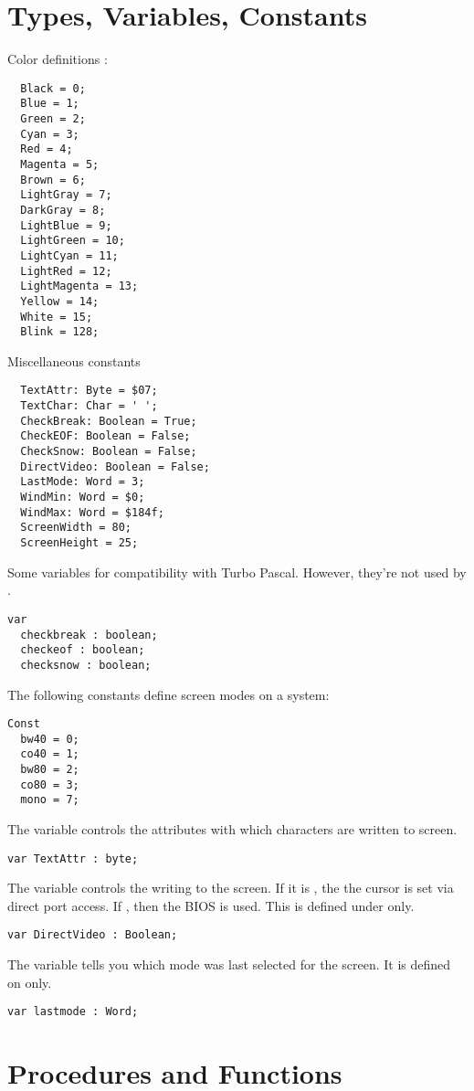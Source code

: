 \section{Types, Variables, Constants}
Color definitions :
\begin{verbatim}
  Black = 0;
  Blue = 1;
  Green = 2;
  Cyan = 3;
  Red = 4;
  Magenta = 5;
  Brown = 6;
  LightGray = 7;
  DarkGray = 8;
  LightBlue = 9;
  LightGreen = 10;
  LightCyan = 11;
  LightRed = 12;
  LightMagenta = 13;
  Yellow = 14;
  White = 15;
  Blink = 128;
\end{verbatim}
Miscellaneous constants
\begin{verbatim}
  TextAttr: Byte = $07;
  TextChar: Char = ' ';
  CheckBreak: Boolean = True;
  CheckEOF: Boolean = False;
  CheckSnow: Boolean = False;
  DirectVideo: Boolean = False;
  LastMode: Word = 3;
  WindMin: Word = $0;
  WindMax: Word = $184f;
  ScreenWidth = 80;
  ScreenHeight = 25;
\end{verbatim}
Some variables for compatibility with Turbo Pascal. However, they're not
used by \fpc.
\begin{verbatim}
var
  checkbreak : boolean;
  checkeof : boolean;
  checksnow : boolean;
\end{verbatim}
The following constants define screen modes on a \dos system:
\begin{verbatim}
Const
  bw40 = 0;
  co40 = 1;
  bw80 = 2;
  co80 = 3;
  mono = 7;
\end{verbatim}
The  variable controls the attributes with which characters
are written to screen.
\begin{verbatim}
var TextAttr : byte;
\end{verbatim}
The  variable controls the writing to the screen. If it is
, the the cursor is set via direct port access. If ,
then the BIOS is used. This is defined under \dos only.
\begin{verbatim}
var DirectVideo : Boolean;
\end{verbatim}
The  variable tells you which mode was last selected for the
screen. It is defined on \dos only.
\begin{verbatim}
var lastmode : Word;
\end{verbatim}

\section{Procedures and Functions}

